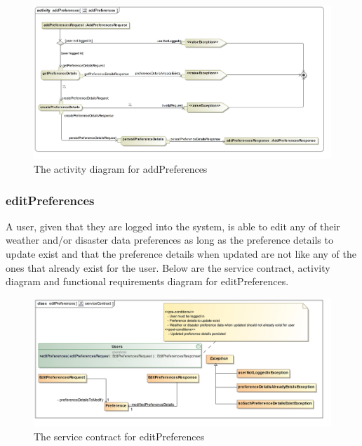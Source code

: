 \begin{figure}[H]
	\centering
	\includegraphics[scale=0.16]{../images/funcReq/addPreferencesActivityDiagram.jpg}
	\caption{The activity diagram for addPreferences \label{overflow}}
\end{figure}

\subsubsection{editPreferences}

A user, given that they are logged into the system, is able to edit any of their weather and/or disaster data preferences as long as the preference details to update exist and that the preference details when updated are not like any of the ones that already exist for the user. Below are the service contract, activity diagram and functional requirements diagram for editPreferences.

\begin{figure}[H]
	\centering
	\includegraphics[scale=0.19]{../images/funcReq/editPreferencesServiceContract.jpg}
	\caption{The service contract for editPreferences \label{overflow}}
\end{figure}

